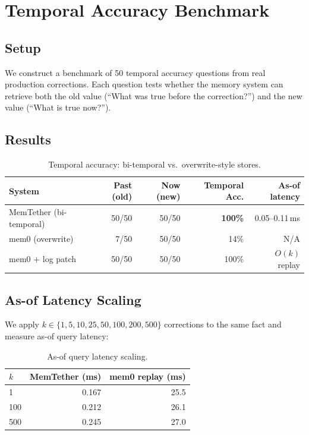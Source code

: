\documentclass{article}
\begin{document}
\section{Temporal Accuracy Benchmark}
\label{sec:benchmark}

\subsection{Setup}
We construct a benchmark of 50 temporal accuracy questions from real production corrections. Each question tests whether the memory system can retrieve both the old value (``What was true before the correction?'') and the new value (``What is true now?'').

\subsection{Results}

\begin{table}[h]
\centering
\caption{Temporal accuracy: bi-temporal vs.\ overwrite-style stores.}
\begin{tabular}{lrrrr}
\toprule
System & Past (old) & Now (new) & Temporal Acc. & As-of latency \\
\midrule
MemTether (bi-temporal) & 50/50 & 50/50 & \textbf{100\%} & 0.05--0.11\,ms \\
mem0 (overwrite) & 7/50 & 50/50 & 14\% & N/A \\
mem0 + log patch & 50/50 & 50/50 & 100\% & $O(k)$ replay \\
\bottomrule
\end{tabular}
\label{tab:temporal}
\end{table}

\subsection{As-of Latency Scaling}

We apply $k \in \{1, 5, 10, 25, 50, 100, 200, 500\}$ corrections to the same fact and measure as-of query latency:

\begin{table}[h]
\centering
\caption{As-of query latency scaling.}
\begin{tabular}{lrr}
\toprule
$k$ & MemTether (ms) & mem0 replay (ms) \\
\midrule
1 & 0.167 & 25.5 \\
100 & 0.212 & 26.1 \\
500 & 0.245 & 27.0 \\
\bottomrule
\end{tabular}
\label{tab:latency}
\end{table}
\end{document}
